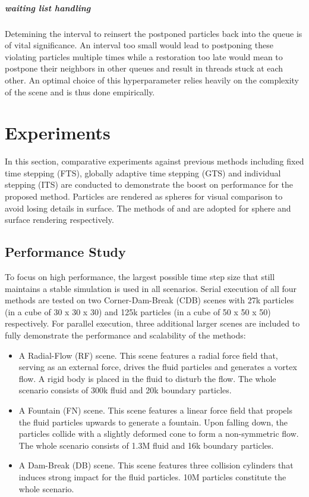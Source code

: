 \documentclass[
	11pt, 
	DIV10,
	ngerman,
	a4paper, 
	oneside, 
	headings=normal, 
	captions=tableheading,
	final, 
	numbers=noenddot
]{scrartcl}
\begin{document}
\subparagraph{waiting list handling}
Detemining the interval to reinsert the postponed particles back into the queue is of vital significance. An interval too small would lead to postponing these violating particles multiple times while a restoration too late would mean to postpone their neighbors in other queues and result in threads stuck at each other. An optimal choice of this hyperparameter relies heavily on the complexity of the scene and is thus done empirically.

\section{Experiments}
In this section, comparative experiments against previous methods including fixed time stepping (FTS), globally adaptive time stepping (GTS) \cite{desbrun1996smoothed} and individual stepping (ITS) \cite{ban2018adaptively} are conducted to demonstrate the boost on performance for the proposed method. Particles are rendered as spheres for visual comparison to avoid losing details in surface. The methods of \cite{reinhardt2017visual} and \cite{bhatacharya2011level} are adopted for sphere and surface rendering respectively.

\subsection{Performance Study}
To focus on high performance, the largest possible time step size that still maintains a stable simulation is used in all scenarios. Serial execution of all four methods are tested on two Corner-Dam-Break (CDB) scenes with 27k particles (in a cube of 30 x 30 x 30) and 125k particles (in a cube of 50 x 50 x 50) respectively. For parallel execution, three additional larger scenes are included to fully demonstrate the performance and scalability of the methods:

\begin{itemize}
    \item A Radial-Flow (RF) scene. This scene features a radial force field that, serving as an external force, drives the fluid particles and generates a vortex flow. A rigid body is placed in the fluid to disturb the flow. The whole scenario consists of 300k fluid and 20k boundary particles.
    \item A Fountain (FN) scene. This scene features a linear force field that propels the fluid particles upwards to generate a fountain. Upon falling down, the particles collide with a slightly deformed cone to form a non-symmetric flow. The whole scenario consists of 1.3M fluid and 16k boundary particles.
    \item A Dam-Break (DB) scene. This scene features three collision cylinders that induces strong impact for the fluid particles. 10M particles constitute the whole scenario.
\end{itemize}
\end{document}
